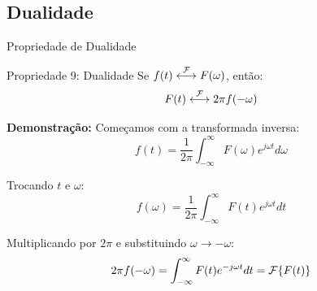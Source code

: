 
%
%
%
%
%
%
%
%
%
%
%


\subsection{Dualidade}

\begin{frame}{Propriedade de Dualidade}

\begin{block}{Propriedade 9: Dualidade}
Se $f(t) \mathrel{\overset{\mathcal{F}}{\longleftrightarrow}} F(\omega)$, então:
\vspace{-2mm}
\[
F(t) \mathrel{\overset{\mathcal{F}}{\longleftrightarrow}} 2\pi f(-\omega)
\]
\vspace{-3mm}
\end{block}

\textbf{Demonstração:} Começamos com a transformada inversa:
\vspace{-2mm}
\[
f(t) = \frac{1}{2\pi} \int_{-\infty}^{\infty} F(\omega) e^{j\omega t} d\omega
\]
\vspace{-5mm}

Trocando $t$ e $\omega$:
\vspace{-2mm}
\[
f(\omega) = \frac{1}{2\pi} \int_{-\infty}^{\infty} F(t) e^{j\omega t} dt
\]
\vspace{-5mm}

Multiplicando por $2\pi$ e substituindo $\omega \to -\omega$:
\vspace{-2mm}
\[
2\pi f(-\omega) = \int_{-\infty}^{\infty} F(t) e^{-j\omega t} dt = \mathcal{F}\{F(t)\}
\]

\end{frame}


